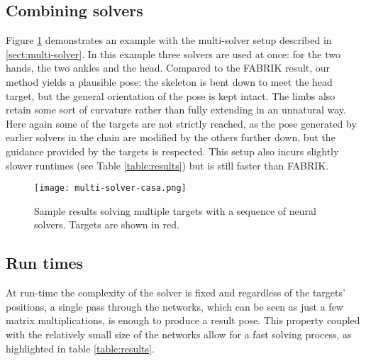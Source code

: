 \subsection{Combining solvers}

Figure \ref{fig:multi-solvers} demonstrates an example with the multi-solver setup described in \ref{sect:multi-solver}. In this example three solvers are used at once: for the two hands, the two ankles and the head. Compared to the FABRIK result, our method yields a plausible pose: the skeleton is bent down to meet the head target, but the general orientation of the pose is kept intact. The limbs also retain some sort of curvature rather than fully extending in an unnatural way. Here again some of the targets are not strictly reached, as the pose generated by earlier solvers in the chain are modified by the others further down, but the guidance provided by the targets is respected. This setup also incurs slightly slower runtimes (see Table \ref{table:results}) but is still faster than FABRIK.
%
\begin{figure}[h!]
    \centering
    \texttt{[image: multi-solver-casa.png]}
    \caption{Sample results solving multiple targets with a sequence of neural solvers. Targets are shown in red. 
    }
    \label{fig:multi-solvers}
\end{figure}
%
\subsection{Run times}


At run-time the complexity of the solver is fixed and regardless of the targets' positions, a single pass through the networks, which can be seen as just a few matrix multiplications, is enough to produce a result pose. This property coupled with the relatively small size of the networks allow for a fast solving process, as highlighted in table \ref{table:results}.

